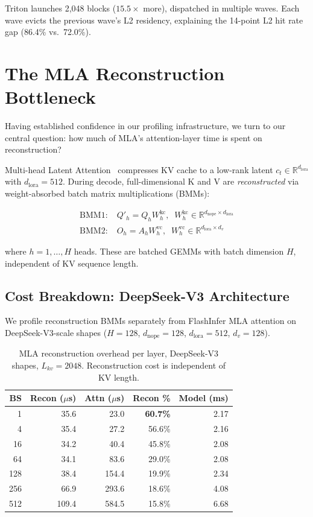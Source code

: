 \documentclass[10pt,twocolumn]{article}
\begin{document}
Triton launches 2,048 blocks ($15.5\times$ more), dispatched in multiple waves.  Each wave evicts the previous wave's L2 residency, explaining the 14-point L2 hit rate gap (86.4\% vs.\ 72.0\%).

\section{The MLA Reconstruction Bottleneck}
\label{sec:recon}

Having established confidence in our profiling infrastructure, we turn to our central question: how much of MLA's attention-layer time is spent on reconstruction?

Multi-head Latent Attention~\cite{deepseekv2} compresses KV cache to a low-rank latent $c_t \in \mathbb{R}^{d_\text{lora}}$ with $d_\text{lora}=512$.  During decode, full-dimensional K and V are \emph{reconstructed} via weight-absorbed batch matrix multiplications (BMMs):

\begin{align}
\text{BMM1:} \; & Q'_h = Q_h W^\text{kc}_h, \;\; W^\text{kc}_h \!\in\! \mathbb{R}^{d_\text{nope} \times d_\text{lora}} \nonumber \\
\text{BMM2:} \; & O_h = A_h W^\text{vc}_h, \;\; W^\text{vc}_h \!\in\! \mathbb{R}^{d_\text{lora} \times d_v} \nonumber
\end{align}

where $h = 1, \ldots, H$ heads.  These are batched GEMMs with batch dimension $H$, independent of KV sequence length.

\subsection{Cost Breakdown: DeepSeek-V3 Architecture}

We profile reconstruction BMMs separately from FlashInfer MLA attention on DeepSeek-V3-scale shapes ($H=128$, $d_\text{nope}=128$, $d_\text{lora}=512$, $d_v=128$).

\begin{table}[h]
\centering
\small
\caption{MLA reconstruction overhead per layer, DeepSeek-V3 shapes, $L_{kv}=2048$.  Reconstruction cost is independent of KV length.}
\label{tab:recon}
\begin{tabular}{@{}rrrrr@{}}
\toprule
BS & Recon ($\mu$s) & Attn ($\mu$s) & Recon \% & Model (ms) \\
\midrule
  1 & 35.6 &  23.0 & \textbf{60.7\%} & 2.17 \\
  4 & 35.4 &  27.2 & 56.6\% & 2.16 \\
 16 & 34.2 &  40.4 & 45.8\% & 2.08 \\
 64 & 34.1 &  83.6 & 29.0\% & 2.08 \\
128 & 38.4 & 154.4 & 19.9\% & 2.34 \\
256 & 66.9 & 293.6 & 18.6\% & 4.08 \\
512 & 109.4 & 584.5 & 15.8\% & 6.68 \\
\bottomrule
\end{tabular}
\end{table}
\end{document}
